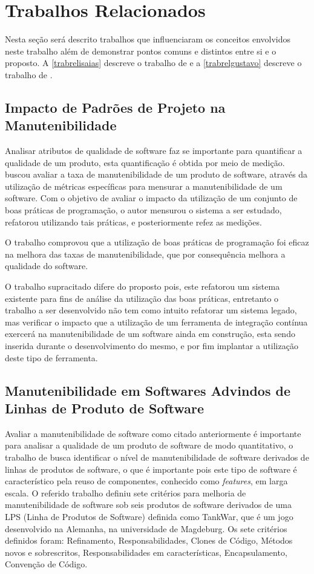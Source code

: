 \chapter{Trabalhos Relacionados}\label{trabalhorel}
Nesta seção será descrito trabalhos que influenciaram os conceitos envolvidos neste trabalho além de demonstrar pontos comuns e distintos entre si e o proposto. A \autoref{trabrelisaias} descreve o trabalho de  e a \autoref{trabrelgustavo} descreve o trabalho de .
\section{Impacto de Padrões de Projeto na Manutenibilidade} \label{trabrelisaias}
Analisar atributos de qualidade de software faz se importante para quantificar a qualidade de um produto, esta quantificação é obtida por meio de medição.  buscou avaliar a taxa de manutenibilidade de um produto de software, através da utilização de métricas específicas para mensurar a manutenibilidade de um software. Com o objetivo de avaliar o impacto da utilização de um conjunto de boas práticas de programação, o autor mensurou o sistema a ser estudado, refatorou utilizando tais práticas, e posteriormente refez as medições.

O trabalho comprovou que a utilização de boas práticas de programação foi eficaz na melhora das taxas de manutenibilidade, que por consequência melhora a qualidade do software.

O trabalho supracitado difere do proposto pois, este refatorou um sistema existente para fins de análise da utilização das boas práticas, entretanto o trabalho a ser desenvolvido não tem como intuito refatorar um sistema legado, mas verificar o impacto que a utilização de um ferramenta de integração contínua exercerá na manutenibilidade de um software ainda em construção, esta sendo inserida durante o desenvolvimento do mesmo, e por fim implantar a utilização deste tipo de ferramenta.


 
\section{Manutenibilidade em Softwares Advindos de Linhas de Produto de Software} \label{trabrelgustavo}
Avaliar a manutenibilidade de software como citado anteriormente é importante para analisar a qualidade de um produto de software de modo quantitativo, o trabalho de  busca identificar o nível de manutenibilidade de software derivados de linhas de produtos de software, o que é importante pois este tipo de software é característico pela reuso de componentes, conhecido como \textit{features}, em larga escala. O referido trabalho definiu sete critérios para melhoria de manutenibilidade de software sob seis produtos de software derivados de uma LPS (Linha de Produtos de Software) definida como TankWar, que é um jogo desenvolvido na Alemanha, na universidade de Magdeburg. Os sete critérios definidos foram: Refinamento, Responsabilidades, Clones de Código, Métodos novos e sobrescritos, Responsabilidades em características, Encapsulamento, Convenção de Código. 

